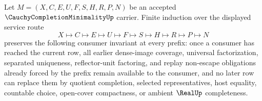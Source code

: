\begin{theorem}
\label{thm:cauchy-completion-minimality-finite-row-induction}
Let $M=(X,C,E,U,F,S,H,R,P,N)$ be an accepted $\CauchyCompletionMinimalityUp$ carrier. Finite induction over the displayed service route
$$
X\longmapsto C\longmapsto E\longmapsto U\longmapsto F\longmapsto S\longmapsto H\longmapsto R\longmapsto P\longmapsto N
$$
preserves the following consumer invariant at every prefix: once a consumer has reached the current row, all earlier dense-image coverage, universal factorization, separated uniqueness, reflector-unit factoring, and replay non-escape obligations already forced by the prefix remain available to the consumer, and no later row can replace them by quotient completion, selected representatives, host equality, countable choice, open-cover compactness, or ambient $\RealUp$ completeness.
\end{theorem}
